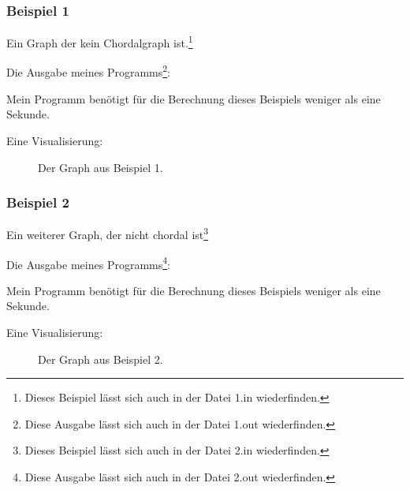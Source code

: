 \subsubsection*{Beispiel 1}
Ein Graph der kein Chordalgraph ist.\footnote{Dieses Beispiel lässt sich auch in der Datei 1.in wiederfinden.}

{\small

}

Die Ausgabe meines Programms\footnote{Diese Ausgabe lässt sich auch in der Datei 1.out wiederfinden.}:

{\small

}

Mein Programm benötigt für die Berechnung dieses Beispiels weniger als eine Sekunde.

Eine Visualisierung:
\begin{center}
\begin{figure}[h]
\caption{Der Graph aus Beispiel 1.}
\end{figure}
\end{center}

\subsubsection*{Beispiel 2}
Ein weiterer Graph, der nicht chordal ist\footnote{Dieses Beispiel lässt sich auch in der Datei 2.in wiederfinden.}

{\small

}

Die Ausgabe meines Programms\footnote{Diese Ausgabe lässt sich auch in der Datei 2.out wiederfinden.}:

{\small

}

Mein Programm benötigt für die Berechnung dieses Beispiels weniger als eine Sekunde.

Eine Visualisierung:
\begin{center}
\begin{figure}[h]
\caption{Der Graph aus Beispiel 2.}
\end{figure}
\end{center}

